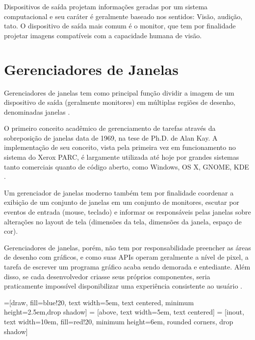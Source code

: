 Dispositivos de saída projetam informações geradas por um sistema computacional
e seu caráter é geralmente baseado nos sentidos: Visão, audição, tato. O
dispositivo de saída mais comum é o monitor, que tem por finalidade projetar
imagens compatíveis com a capacidade humana de visão.

\section{Gerenciadores de Janelas}

Gerenciadores de janelas tem como principal função dividir a imagem de um
dispositivo de saída (geralmente monitores) em múltiplas regiões de desenho,
denominadas janelas \cite[p. 5]{myers1996uimss}.

O primeiro conceito acadêmico de gerenciamento de tarefas através da
sobreposição de janelas data de 1969, na tese de Ph.D. de Alan Kay. A
implementação de seu conceito, vista pela primeira vez em funcionamento no
sistema do Xerox PARC, é largamente utilizada até hoje por grandes sistemas
tanto comerciais quanto de código aberto, como Windows, OS X, GNOME, KDE
\cite[p. 7]{myers2000past}.

Um gerenciador de janelas moderno também tem por finalidade coordenar a exibição
de um conjunto de janelas em um conjunto de monitores, escutar por eventos de
entrada (mouse, teclado) e informar os responsáveis pelas janelas sobre
alterações no layout de tela (dimensões da tela, dimensões da janela, espaço de
cor).

Gerenciadores de janelas, porém, não tem por responsabilidade preencher as áreas
de desenho com gráficos, e como suas APIs operam geralmente a nível de pixel, a
tarefa de escrever um programa gráfico acaba sendo demorada e entediante. Além
disso, se cada desenvolvedor criasse seus próprios componentes, seria
praticamente impossível disponibilizar uma experiência consistente ao usuário
.

=[draw, fill=blue!20, text width=5em,
    text centered, minimum height=2.5em,drop shadow]
 = [above, text width=5em, text centered]
 = [inout, text width=10em, fill=red!20,
    minimum height=6em, rounded corners, drop shadow]

\def\blockdist{2.3}
\def\edgedist{2.5}

